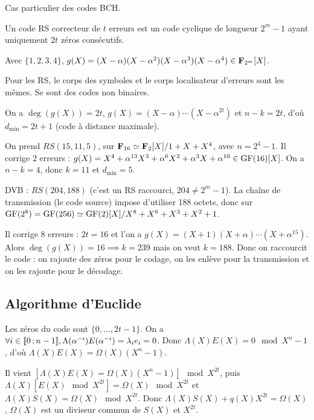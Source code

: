 Cas particulier des codes BCH.

\begin{defn}
	Un code RS correcteur de $t$ erreurs est un code cyclique de longueur $2^m - 1$ ayant uniquement $2t$ zéros consécutifs.
\end{defn}

\begin{ex}
	Avec $\{ 1, 2, 3, 4 \}$, $g(X) = (X - \alpha)(X - \alpha^2)(X - \alpha^3)(X - \alpha^4) \in \mathbf{F}_{2^m}[X]$.
\end{ex}

Pour les RS, le corps des symboles et le corps localisateur d'erreurs sont les mêmes.
Se sont des codes non binaires.

On a $\deg(g(X)) = 2t$, $g(X) = (X - \alpha) \cdots (X - \alpha^{2t})$ et $n - k = 2t$, d'où $d_{\min} = 2t + 1$ (code à distance maximale).

\begin{ex}
	On prend $RS(15,11,5)$, sur $\mathbf{F}_{16} \simeq \mathbf{F}_2[X] / 1 + X + X^4$, avec $n = 2^4 - 1$.
	Il corrige 2 erreurs : $g(X) = X^4 + \alpha^{13} X^3 + \alpha^6 X^2 + \alpha^3 X + \alpha^{10} \in \mathrm{GF}(16)[X]$.
	On a $n - k = 4$, donc $k = 11$ et $d_{\min} = 5$.
\end{ex}

\begin{ex}
	DVB : $RS(204,188)$ (c'est un RS raccourci, $204 \neq 2^m - 1$).
	La chaîne de transmission (le code source) impose d'utiliser 188 octets, donc sur $\mathrm{GF}(2^8) = \mathrm{GF}(256) \simeq \mathrm{GF}(2)[X] / X^8 + X^6 + X^3 + X^2 + 1$.

	Il corrige 8 erreurs : $2t = 16$ et l'on a $g(X) = (X + 1)(X + \alpha) \cdots (X + \alpha^{15})$.
	Alors $\deg(g(X)) = 16 \implies k = 239$ mais on veut $k = 188$.
	Donc on raccourcit le code : on rajoute des zéros pour le codage, on les enlève pour la transmission et on les rajoute pour le décodage.
\end{ex}


\subsection{Algorithme d'Euclide}

	Les zéros du code sont $\{ 0,\ldots,2t - 1 \}$.
	On a $\forall i \in \mathopen{}\mathclose{\left[\![0\mathclose{}\mathpunct{};n - 1\right]\!]}, \Lambda(\alpha^{-i}) E(\alpha^{-i}) = \lambda_i e_i = 0$.
	Donc $\Lambda(X) E(X) = 0 \mod{X^n - 1}$, d'où $\Lambda(X)E(X) = \Omega(X) (X^n - 1)$.

	Il vient $[\Lambda(X)E(X) = \Omega(X) (X^n - 1)] \mod{X^{2t}}$, puis $\Lambda(X) [E(X) \mod{X^{2t}}] = \Omega(X) \mod{X^{2t}}$ et $\Lambda(X) S(X) = \Omega(X) \mod{X^{2t}}$.
	Donc $\Lambda(X)S(X) + q(X)X^{2t} = \Omega(X)$, $\Omega(X)$ est un diviseur commun de $S(X)$ et $X^{2t}$.


